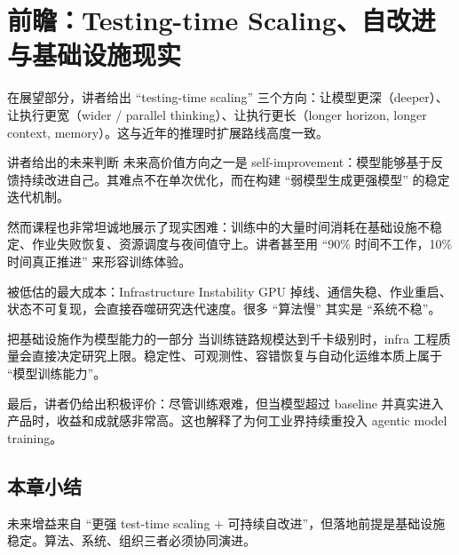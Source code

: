 \section{前瞻：Testing-time Scaling、自改进与基础设施现实}

在展望部分，讲者给出 ``testing-time scaling'' 三个方向：让模型更深（deeper）、让执行更宽（wider / parallel thinking）、让执行更长（longer horizon, longer context, memory）。这与近年的推理时扩展路线高度一致。

\begin{importantbox}{讲者给出的未来判断}
未来高价值方向之一是 self-improvement：模型能够基于反馈持续改进自己。其难点不在单次优化，而在构建 ``弱模型生成更强模型'' 的稳定迭代机制。
\end{importantbox}

然而课程也非常坦诚地展示了现实困难：训练中的大量时间消耗在基础设施不稳定、作业失败恢复、资源调度与夜间值守上。讲者甚至用 ``90\% 时间不工作，10\% 时间真正推进'' 来形容训练体验。

\begin{warningbox}{被低估的最大成本：Infrastructure Instability}
GPU 掉线、通信失稳、作业重启、状态不可复现，会直接吞噬研究迭代速度。很多 ``算法慢'' 其实是 ``系统不稳''。
\end{warningbox}

\begin{knowledgebox}{把基础设施作为模型能力的一部分}
当训练链路规模达到千卡级别时，infra 工程质量会直接决定研究上限。稳定性、可观测性、容错恢复与自动化运维本质上属于 ``模型训练能力''。
\end{knowledgebox}

最后，讲者仍给出积极评价：尽管训练艰难，但当模型超过 baseline 并真实进入产品时，收益和成就感非常高。这也解释了为何工业界持续重投入 agentic model training。

\subsection{本章小结}
未来增益来自 ``更强 test-time scaling + 可持续自改进''，但落地前提是基础设施稳定。算法、系统、组织三者必须协同演进。

